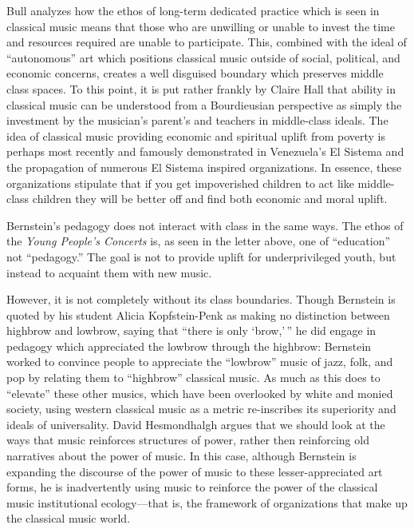 \documentclass[12pt,letterpaper]{article}
\begin{document}
	Bull analyzes how the ethos of long-term dedicated practice which is 
	seen in classical music means that those who are unwilling or unable to
	invest the time and resources required are unable to participate.
	This, combined with the ideal of ``autonomous'' art which 
	positions classical music outside of social, political, and economic 
	concerns, creates a well disguised boundary which preserves middle 
	class spaces.\autocite[6]{Bull} To this point, it is put rather frankly
	 by Claire Hall that ability in classical music can be 
	understood from a Bourdieusian perspective as simply the investment by 
	the musician's parent's and teachers in middle-class 
	ideals.\autocite[7]{Bull}
	The idea of classical music providing economic and spiritual uplift from
	poverty is perhaps most recently and famously demonstrated in 
	Venezuela's El Sistema and the propagation of numerous El Sistema 
	inspired organizations.  In essence, these organizations stipulate that
	if you get impoverished children to act like middle-class children they
	will be better off and find both economic and moral uplift.  

	Bernstein's pedagogy does not interact with class in the same ways. 
	The ethos of the \textit{Young People's Concerts} is, as seen in the
	letter above, one of ``education'' not ``pedagogy.'' 
	The goal is not to provide uplift for
	underprivileged youth, but instead to acquaint them with new music.   

	However, it is not completely without its class boundaries.
	Though Bernstein is quoted by
	his student Alicia Kopfstein-Penk as making no distinction between
	highbrow and lowbrow, saying that ``there is only 
	`brow,'\,''\autocite[xvi]{Kopfstein}  he did engage in pedagogy which
	appreciated the lowbrow through the highbrow: Bernstein worked to
	convince people to appreciate the ``lowbrow'' music of jazz, folk, and
	pop by relating them to ``highbrow'' classical 
	music.\autocite[63]{Kopfstein} As much as this does to ``elevate''
	these other musics, which have been overlooked by white and monied 
	society, using western classical music as a metric re-inscribes its
	superiority and ideals of universality.  
	David Hesmondhalgh argues that we should look at the ways that
	music reinforces structures of power, rather then reinforcing old 
	narratives about the power of music.\autocite[xiii]{Kopfstein} 
	In this case, although Bernstein is expanding the discourse of the power
	of music to these lesser-appreciated art forms, he is inadvertently 
	using
	music to reinforce the power of the classical music institutional 
	ecology---that is, the framework of organizations that make up the 
	classical music world.\autocite[27]{Bull}  
\end{document}
